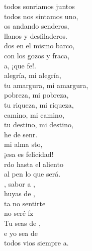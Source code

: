 \begin{cancion}%
	 todos sonriamos juntos\\
	\jump
todos nos sintamos uno,\\
	os andando senderos,\\
	\jump
llanos y desfiladeros.\\
	dos en el mismo barco,\\
	con los gozos y fraca,\\
	a, ¡que fe!.\\
	\jump
	alegría, mi alegría,\\
	\jump
tu amargura, mi amargura,\\
	pobreza, mi pobreza,\\
	\jump
tu riqueza, mi riqueza,\\
	 camino, mi camino,\\
	tu destino, mi destino, \\
	he de senr. \\
	\jump
	mi alma sto,\\
	¡esa es felicidad! \\
	rdo hasta el aliento\\
	al pen lo que será. \\
	, sabor a ,\\
	 huyas de ,\\
	ta no sentirte\\
	no seré fz \\
	 Tu seas de ,\\
	e yo sea de  \\
	 todos vios siempre a.\\
\end{cancion}%
